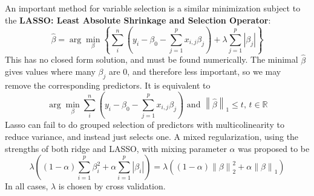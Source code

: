 \documentclass[12pt, a4paper]{article}
\theoremstyle{definition}
\newcommand{\R}{\mathbb{R}}                           %
\newcommand{\lam}{\lambda}
\newcommand{\abs}[1]{\left| #1 \right|}
\newcommand{\BB}[1]{\left(#1\right)}
\newcommand{\norm}[1]{\left\lVert#1\right\rVert}
\begin{document}
	  An important method for variable selection is a similar minimization subject to the {\bf LASSO: Least Absolute Shrinkage and Selection Operator}:
	  $$
	  \hat \beta = \arg\min_\beta \left\{ \sum_i^n \BB{y_i - \beta_0 - \sum_{j=1}^p x_{i,j} \beta_j} + \lambda \sum_{j=1}^p \abs{\beta_j}  \right\}
	  $$
	  This has no closed form solution, and must be found numerically. The minimal $\hat \beta$ gives values where many $\beta_j$ are $0$, and therefore less important, so we may remove the corresponding predictors. It is equivalent to
		$$
			\arg\min_\beta \sum_i^n \BB{y_i - \beta_0 - \sum_{j=1}^p x_{i,j} \beta_j} \text{ and } \norm{\hat \beta}_1 \leq t,\, t \in \R
		$$
	Lasso can fail to do grouped selection of predictors with multicolinearity to reduce variance, and instead just selects one. A mixed regularization, using the strengths of both ridge and LASSO, with mixing parameter $\alpha$ was proposed to be
	$$
		\lambda \BB{(1-\alpha) \sum_{i=1}^p \beta_i^2 + \alpha \sum_{i=1}^p \abs{\beta_i}} = \lambda \BB{ (1-\alpha) \norm{\beta}_2^2 + \alpha \norm{\beta}_1 } 
	$$
	In all cases, $\lam$ is chosen by cross validation.
	
		
		
		
			
	
		
		
\end{document}
